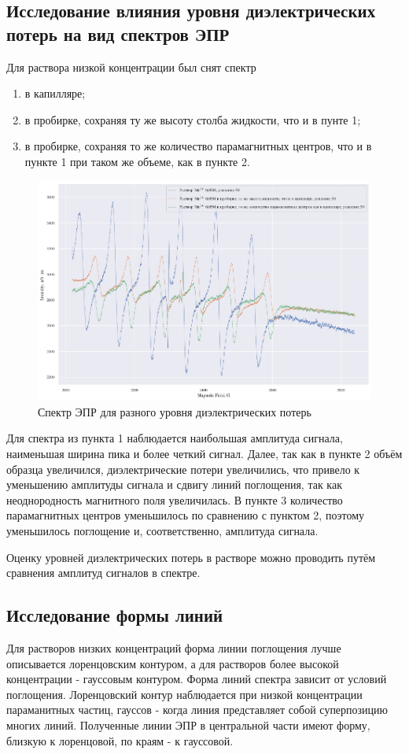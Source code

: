 \documentclass[a4paper,14pt]{article}
\begin{document}
\subsection{Исследование влияния уровня диэлектрических потерь на вид спектров ЭПР}
Для раствора низкой концентрации был снят спектр 
\begin{enumerate}
	\item в капилляре;
	\item в пробирке, сохраняя ту же высоту столба жидкости, что и в пунте 1;
	\item в пробирке, сохраняя то же количество парамагнитных центров, что и в пункте 1 при таком же объеме, как в пункте 2. 
\end{enumerate}
\begin{figure}[h]
	\centering
	\includegraphics{рис15}
	\caption{Спектр ЭПР для разного уровня диэлектрических потерь}
	\label{fig:15}
\end{figure}
\par
Для спектра из пункта 1 наблюдается наибольшая амплитуда сигнала, наименьшая ширина пика и более четкий сигнал. Далее, так как в пункте 2 объём образца увеличился, диэлектрические потери увеличились, что привело к уменьшению амплитуды сигнала и сдвигу линий поглощения, так как неоднородность магнитного поля увеличилась. В пункте 3 количество парамагнитных центров уменьшилось по сравнению с пунктом 2, поэтому уменьшилось поглощение и, соответственно, амплитуда сигнала. 
\par 
Оценку уровней диэлектрических потерь в растворе можно проводить путём сравнения амплитуд сигналов в спектре.
\subsection{Исследование формы линий} 
Для растворов низких концентраций форма линии поглощения лучше описывается лоренцовским контуром, а для растворов более высокой концентрации - гауссовым контуром. Форма линий спектра зависит от условий поглощения. Лоренцовский контур наблюдается при низкой концентрации параманитных частиц, гауссов - когда линия представляет собой суперпозицию многих линий. Полученные линии ЭПР в центральной части имеют форму, близкую к лоренцовой, по краям - к гауссовой.
\end{document}
